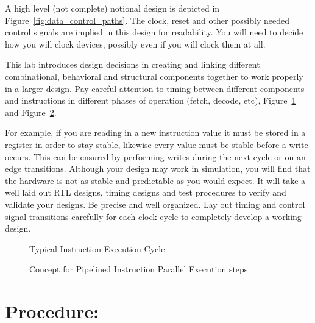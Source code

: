 \documentclass{article}
\begin{document}
A high level (not complete) notional design is depicted in Figure~\ref{fig:data_control_paths}. The clock, reset and other possibly needed control signals are implied in this design for readability. You will need to decide how you will clock devices, possibly even if you will clock them at all.

This lab introduces design decisions in creating and linking different combinational, behavioral and structural components together to work properly in a larger design. Pay careful attention to timing between different components and instructions in different phases of operation (fetch, decode, etc), Figure~\ref{fig:iec} and Figure~\ref{fig:pipeline_instruction_execution_example}.

For example, if you are reading in a new instruction value it must be stored in a register in order to stay stable, likewise every value must be stable before a write occurs. This can be ensured by performing writes during the next cycle or on an edge transitions. Although your design may work in simulation, you will find that the hardware is not as stable and predictable as you would expect. It will take a well laid out RTL designs, timing designs and test procedures to verify and validate your designs. Be precise and well organized. Lay out timing and control signal transitions carefully for each clock cycle to completely develop a working design.

\begin{figure}[!htbp]
  \centering
  \caption{Typical Instruction Execution Cycle}
  \label{fig:iec}
\end{figure}

\begin{figure}[!htbp]
  \centering
  \caption{Concept for Pipelined Instruction Parallel Execution steps}
  \label{fig:pipeline_instruction_execution_example}
\end{figure}

\section{Procedure:}
\end{document}
